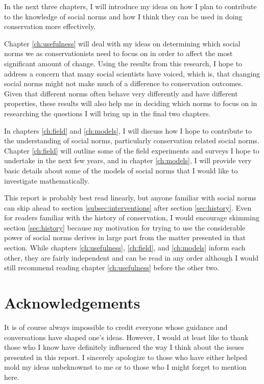 \documentclass{report}
\begin{document}
In the next three chapters, I will introduce my ideas on how I plan to contribute to the knowledge of social norms and how I think they can be used in doing conservation more effectively. 

Chapter \ref{ch:usefulness} will deal with my ideas on determining which social norms we as conservationists need to focus on in order to affect the most significant amount of change. Using the results from this research, I hope to address a concern that many social scientists have voiced, which is, that changing social norms might not make much of a difference to conservation outcomes. Given that different norms often behave very differently and have different properties, these results will also help me in deciding which norms to focus on in researching the questions I will bring up in the final two chapters.

In chapters \ref{ch:field} and \ref{ch:models}, I will discuss how I hope to contribute to the understanding of social norms, particularly conservation related social norms. Chapter \ref{ch:field} will outline some of the field experiments and surveys I hope to undertake in the next few years, and in chapter \ref{ch:models}, I will provide very basic details about some of the models of social norms that I would like to investigate mathematically.

This report is probably best read linearly, but anyone familiar with social norms can skip ahead to section \ref{subsec:interventions} after section \ref{sec:history}. Even for readers familiar with the history of conservation, I would encourage skimming section \ref{sec:history} because my motivation for trying to use the considerable power of social norms derives in large part from the matter presented in that section. While chapters \ref{ch:usefulness}, \ref{ch:field}, and \ref{ch:models} inform each other, they are fairly independent and can be read in any order although I would still recommend reading chapter \ref{ch:usefulness} before the other two.

\chapter*{Acknowledgements}

It is of course always impossible to credit everyone whose guidance and conversations have shaped one's ideas. However, I would at least like to thank those who I know have definitely influenced the way I think about the issues presented in this report. I sincerely apologize to those who have either helped mold my ideas unbeknownst to me or to those who I might forget to mention here.
\end{document}
